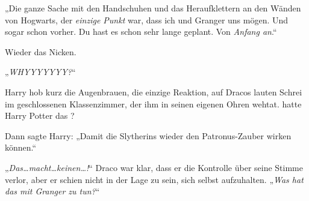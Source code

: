 „Die ganze Sache mit den Handschuhen und das Heraufklettern an den Wänden von Hogwarts, der \emph{einzige Punkt} war, dass ich und Granger uns mögen. Und sogar schon vorher. Du hast es schon sehr lange geplant. Von \emph{Anfang an}.“

Wieder das Nicken.

„\emph{WHYYYYYYY?}“

Harry hob kurz die Augenbrauen, die einzige Reaktion, auf Dracos lauten Schrei im geschlossenen Klassenzimmer, der ihm in seinen eigenen Ohren wehtat.  hatte Harry Potter das ?

Dann sagte Harry: „Damit die Slytherins wieder den Patronus-Zauber wirken können.“

„\emph{Das…macht…keinen…!}“ Draco war klar, dass er die Kontrolle über seine Stimme verlor, aber er schien nicht in der Lage zu sein, sich selbst aufzuhalten. „\emph{Was hat das mit Granger zu tun?}“

